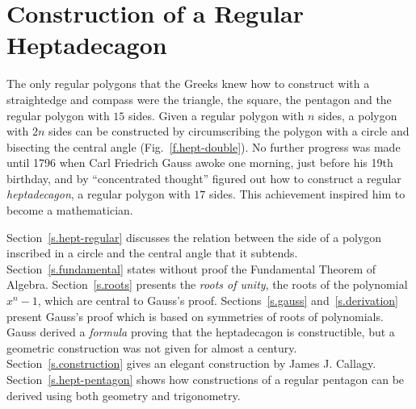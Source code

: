 

\chapter{Construction of a Regular Heptadecagon}\label{c.heptadecagon}




The only regular polygons that the Greeks knew how to construct with a straightedge and compass were the triangle, the square, the pentagon and the regular polygon with $15$ sides. Given a regular polygon with $n$ sides, a polygon with $2n$ sides can be constructed by circumscribing the polygon with a circle and bisecting the central angle (Fig.~\ref{f.hept-double}). No further progress was made until 1796 when Carl Friedrich Gauss awoke one morning, just before his 19th birthday, and by ``concentrated thought'' figured out how to construct a regular \emph{heptadecagon}, a regular polygon with $17$ sides. This achievement inspired him to become a mathematician.

Section~\ref{s.hept-regular} discusses the relation between the side of a polygon inscribed in a circle and the central angle that it subtends. Section~\ref{s.fundamental} states without proof the Fundamental Theorem of Algebra. Section~\ref{s.roots} presents the \emph{roots of unity}, the roots of the polynomial $x^n-1$, which are central to Gauss's proof. Sections~\ref{s.gauss} and~\ref{s.derivation} present Gauss's proof which is based on symmetries of roots of polynomials. Gauss derived a \emph{formula} proving that the heptadecagon is constructible, but a geometric construction was not given for almost a century. Section~\ref{s.construction} gives an elegant construction by James J. Callagy. Section~\ref{s.hept-pentagon} shows how constructions of a regular pentagon can be derived using both geometry and trigonometry.


